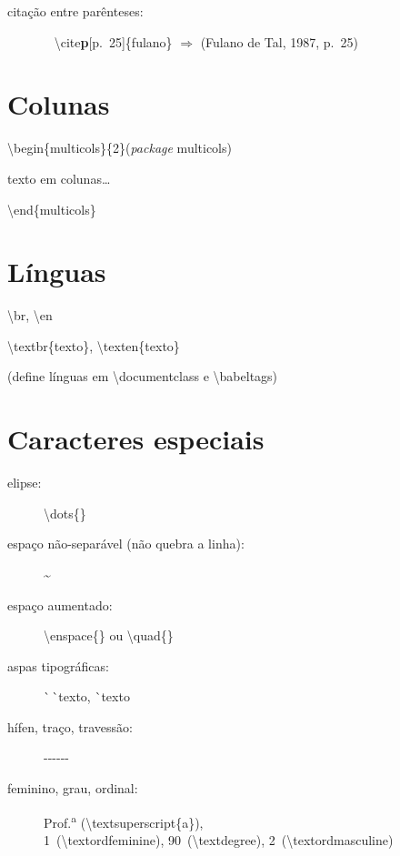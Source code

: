 \documentclass[10pt,twoside,english,brazilian]{article}
\begin{document}
\begin{multicols}{3}
\begin{description}
  \item[citação entre parênteses:]~\vspace{2pt}\newline
    \null\quad\textbackslash{}cite\textbf{p}[p.~25]\{fulano\} $\Rightarrow$ (Fulano de Tal, 1987, p.~25)
\end{description}

\section*{Colunas}

\textbackslash{}begin\{multicols\}\{2\}\quad (\textit{package} \textsf{multicols})

\quad texto em colunas\dots

\textbackslash{}end\{multicols\}

\columnbreak

\section*{Línguas}

\textbackslash{}br, \textbackslash{}en

\textbackslash{}textbr\{texto\}, \textbackslash{}texten\{texto\}

(define línguas em \textsf{\textbackslash{}documentclass} e \textsf{\textbackslash{}babeltags})

\section*{Caracteres especiais}

\begin{description}
  \item[elipse:] \textbackslash{}dots\{\}
  \item[espaço não-separável \textmd{(não quebra a linha)}:] \textasciitilde{}
  \item[espaço aumentado:] \textbackslash{}enspace\{\} ou \textbackslash{}quad\{\}
  \item[aspas tipográficas:] \strut\`\space\,\`\space\;\!texto\;\!\textquotesingle\:\textquotesingle,
                \`\space\;\!texto\;\!\textquotesingle
  \item[hífen, traço, travessão:] -\quad -\hspace{.7pt}-\quad -\hspace{.7pt}-\hspace{.7pt}-
  \item[feminino, grau, ordinal:]
                Prof.\textsuperscript{a} (\textbackslash textsuperscript\{a\}),\\
                1\textordfeminine\ (\textbackslash textordfeminine),
                90\textdegree\ (\textbackslash textdegree),
                2\textordmasculine\ (\textbackslash textordmasculine)
\end{description}


\end{multicols}
\end{document}
